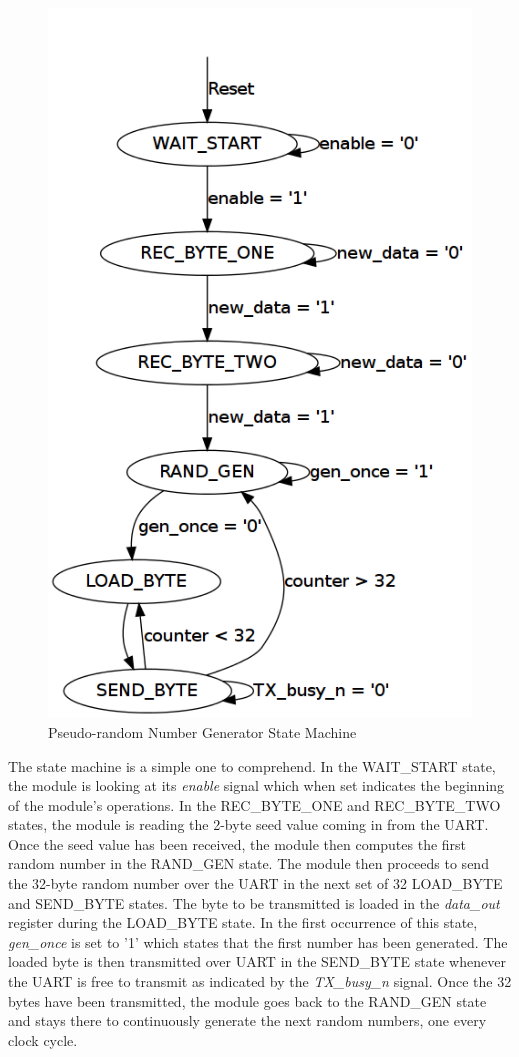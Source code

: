 \documentclass[journal]{IEEEtran}
\begin{document}
	\begin{figure}[h]
		\centering
		\includegraphics[scale=0.3]{graphviz/PRSG_state_diagram.png}
		\caption{Pseudo-random Number Generator State Machine}
	\end{figure}   

The state machine is a simple one to comprehend. In the WAIT\_START state, the module is looking at its \textit{enable} signal which when set indicates the beginning of the module's operations. In the REC\_BYTE\_ONE and REC\_BYTE\_TWO states, the module is reading the 2-byte seed value coming in from the UART. Once the seed value has been received, the module then computes the first random number in the RAND\_GEN state. The module then proceeds to send the 32-byte random number over the UART in the next set of 32 LOAD\_BYTE and SEND\_BYTE states. The byte to be transmitted is loaded in the \textit{data\_out} register during the LOAD\_BYTE state. In the first occurrence of this state, \textit{gen\_once} is set to '1' which states that the first number has been generated. The loaded byte is then transmitted over UART in the SEND\_BYTE state whenever the UART is free to transmit as indicated by the \textit{TX\_busy\_n} signal. Once the 32 bytes have been transmitted, the module goes back to the RAND\_GEN state and stays there to continuously generate the next random numbers, one every clock cycle.
\end{document}
